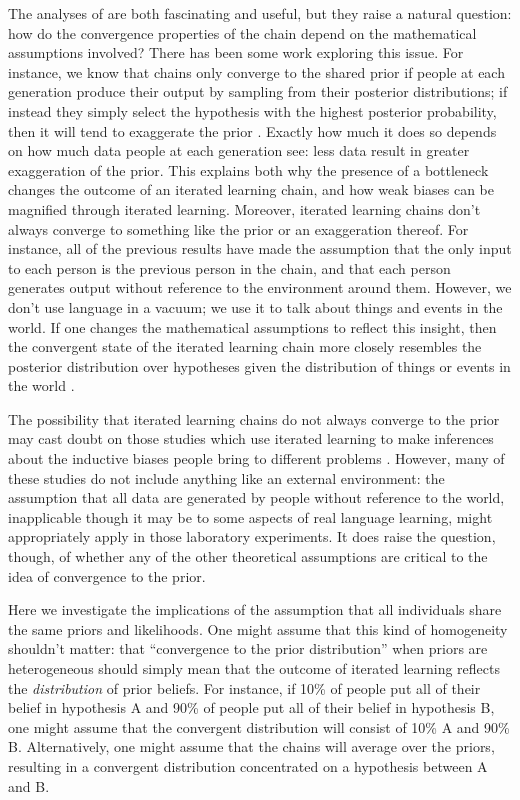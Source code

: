 \documentclass[doc]{apa6}
\begin{document}
The analyses of \textcite{griffiths_language_2007} are both fascinating and useful, but they raise a natural question: how do the convergence properties of the chain depend on the mathematical assumptions involved? There has been some work exploring this issue. For instance, we know that chains only converge to the shared prior if people at each generation produce their output by sampling from their posterior distributions; if instead they simply select the hypothesis with the highest posterior probability, then it will tend to exaggerate the prior \parencite{kirbyetal07}. Exactly how much it does so depends on how much data people at each generation see: less data result in greater exaggeration of the prior. This explains both why the presence of a bottleneck changes the outcome of an iterated learning chain, and how weak biases can be magnified through iterated learning. Moreover, iterated learning chains don't always converge to something like the prior or an exaggeration thereof. For instance, all of the previous results have made the assumption that the only input to each person is the previous person in the chain, and that each person generates output without reference to the environment around them. However, we don't use language in a vacuum; we use it to talk about things and events in the world. If one changes the mathematical assumptions to reflect this insight, then the convergent state of the iterated learning chain more closely resembles the posterior distribution over hypotheses given the distribution of things or events in the world \parencite{perforsnavarro14}. 

The possibility that iterated learning chains do not always converge to the prior may cast doubt on those studies which use iterated learning to make inferences about the inductive biases people bring to different problems \parencite{kalish_iterated_2007,lewvul15,lewandowskyetal09,caninietal14}. However, many of these studies do not include anything like an external environment: the assumption that all data are generated by people without reference to the world, inapplicable though it may be to some aspects of real language learning, might appropriately apply in those laboratory experiments. It does raise the question, though, of whether any of the other theoretical assumptions are critical to the idea of convergence to the prior.

Here we investigate the implications of the assumption that all individuals share the same priors and likelihoods. One might assume that this kind of homogeneity shouldn't matter: that ``convergence to the prior distribution'' when priors are heterogeneous should simply mean that the outcome of iterated learning reflects the {\it distribution} of prior beliefs.  For instance, if 10\% of people put all of their belief in hypothesis A and 90\% of people put all of their belief in hypothesis B, one might assume that the convergent distribution will consist of 10\% A and 90\% B. Alternatively, one might assume that the chains will average over the priors, resulting in a convergent distribution concentrated on a hypothesis between A and B.
\end{document}
